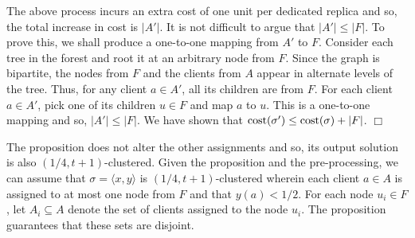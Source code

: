 \documentclass[11pt]{article}
\newcommand{\pair}[2] {\langle #1, #2\rangle}
\newcommand{\cost} {{\rm cost}}
\newcommand{\qed} {\hfill$\Box$}
\begin{document}
The above process incurs an extra cost of one unit per dedicated replica and so, the total increase in cost is $|A'|$.  
It is not difficult to argue that $|A'| \leq |F|$. To prove this, we shall produce a one-to-one mapping from $A'$ to $F$.
Consider each tree in the forest and root it at an arbitrary node from $F$. 
Since the graph is bipartite, the nodes from $F$ and the clients from $A$ appear in alternate levels of the tree.
Thus, for any client $a\in A'$, all its children are from $F$.
For each client $a\in A'$, pick one of its children $u\in F$ and map $a$ to $u$.
This is a one-to-one mapping and so, $|A'|\leq |F|$. We have shown that $\cost(\sigma') \leq \cost(\sigma) + |F|$.
\qed


%


The proposition does not alter the other assignments and so, its output solution is also $(1/4, t+1)$-clustered.
Given the proposition and the pre-processing, we can assume that $\sigma=\pair{x}{y}$ is $(1/4, t+1)$-clustered 
wherein each client $a\in A$ is assigned to at most one node from $F$ and that $y(a) < 1/2$.
For each node $u_i\in F$, let $A_i\subseteq A$ denote the set of clients assigned to the node $u_i$.
The proposition guarantees that these sets are disjoint. 
\end{document}
